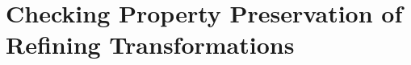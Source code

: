 \chapter{Checking Property Preservation of Refining Transformations}
\label{chap:lts-transformations}















 